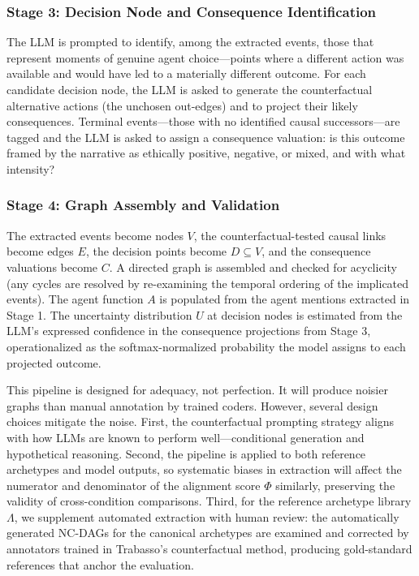 \documentclass[11pt,letterpaper]{article}
\theoremstyle{defn}
\begin{document}
\subsubsection*{Stage 3: Decision Node and Consequence Identification}

The LLM is prompted to identify, among the extracted events, those that represent moments of genuine agent choice---points where a different action was available and would have led to a materially different outcome. For each candidate decision node, the LLM is asked to generate the counterfactual alternative actions (the unchosen out-edges) and to project their likely consequences. Terminal events---those with no identified causal successors---are tagged and the LLM is asked to assign a consequence valuation: is this outcome framed by the narrative as ethically positive, negative, or mixed, and with what intensity?

\subsubsection*{Stage 4: Graph Assembly and Validation}

The extracted events become nodes $V$, the counterfactual-tested causal links become edges $E$, the decision points become $D \subseteq V$, and the consequence valuations become $C$. A directed graph is assembled and checked for acyclicity (any cycles are resolved by re-examining the temporal ordering of the implicated events). The agent function $A$ is populated from the agent mentions extracted in Stage 1. The uncertainty distribution $U$ at decision nodes is estimated from the LLM's expressed confidence in the consequence projections from Stage 3, operationalized as the softmax-normalized probability the model assigns to each projected outcome.

\medskip

This pipeline is designed for adequacy, not perfection. It will produce noisier graphs than manual annotation by trained coders. However, several design choices mitigate the noise. First, the counterfactual prompting strategy aligns with how LLMs are known to perform well---conditional generation and hypothetical reasoning. Second, the pipeline is applied to both reference archetypes and model outputs, so systematic biases in extraction will affect the numerator and denominator of the alignment score $\Phi$ similarly, preserving the validity of cross-condition comparisons. Third, for the reference archetype library $\Lambda$, we supplement automated extraction with human review: the automatically generated NC-DAGs for the canonical archetypes are examined and corrected by annotators trained in Trabasso's counterfactual method, producing gold-standard references that anchor the evaluation.
\end{document}

